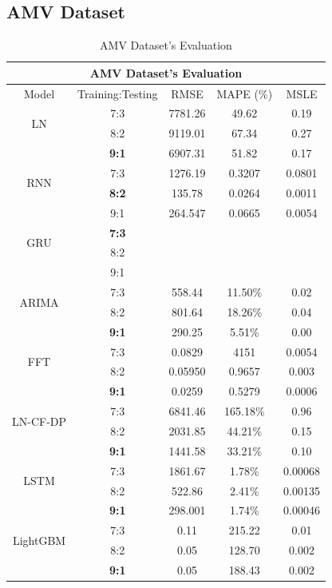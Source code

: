 \documentclass{ieeeojies}
\begin{document}
\subsection{AMV Dataset} 
\begin{table}[H]
    \centering
    \begin{tabular}{|c|c|c|c|c|}
         \hline
         \multicolumn{5}{|c|}{\textbf{AMV Dataset's Evaluation}}\\
         \hline
         \centering Model & Training:Testing & RMSE & MAPE (\%) & MSLE\\
         \hline
         \multirow{2}{*}{LN}& 7:3 & 7781.26 & 49.62 & 0.19\\ & 8:2 & 9119.01 & 67.34 & 0.27\\ & \textbf{9:1}& 6907.31& 51.82 & 0.17\\
         \hline
         \multirow{2}{*}{RNN} & 7:3&1276.19&0.3207&0.0801\\ & \textbf{8:2}&135.78&0.0264&0.0011\\ & 9:1  &264.547 &0.0665 &0.0054 \\
         \hline
         \multirow{2}{*}{GRU} & \textbf{7:3}	& & & \\ & 8:2 & & & \\ & 9:1 & & & \\
         \hline
         \multirow{2}{*}{ARIMA} & 7:3 & 558.44 & 11.50\% & 0.02 \\ & 8:2 & 801.64 & 18.26\% & 0.04 \\ & \textbf{9:1} & 290.25 & 5.51\% & 0.00\\
         \hline
         \multirow{2}{*}{FFT}& 7:3	& 0.0829& 4151& 0.0054\\ & 8:2 & 0.05950& 0.9657& 0.003\\ & \textbf{9:1} & 0.0259& 0.5279& 0.0006\\
         \hline
         \multirow{2}{*}{LN-CF-DP} & 7:3 & 6841.46 & 165.18\% & 0.96 \\ & 8:2 &2031.85	& 44.21\%&  0.15 \\ & \textbf{9:1} &1441.58&33.21\% & 0.10\\
         \hline
         \multirow{2}{*}{LSTM}& 7:3& 1861.67& 1.78\%& 0.00068\\ & 8:2 & 522.86& 2.41\%& 0.00135\\ & \textbf{9:1}& 298.001& 1.74\%& 0.00046\\
         \hline
         \multirow{2}{*}{LightGBM}& 7:3& 0.11& 215.22 & 0.01\\ & 8:2 & 0.05& 128.70 & 0.002\\ & \textbf{9:1}& 0.05& 188.43 & 0.002\\
         \hline
    \end{tabular}
    \caption{AMV Dataset's Evaluation}
    \label{vcbresult}
\end{table}
\end{document}
